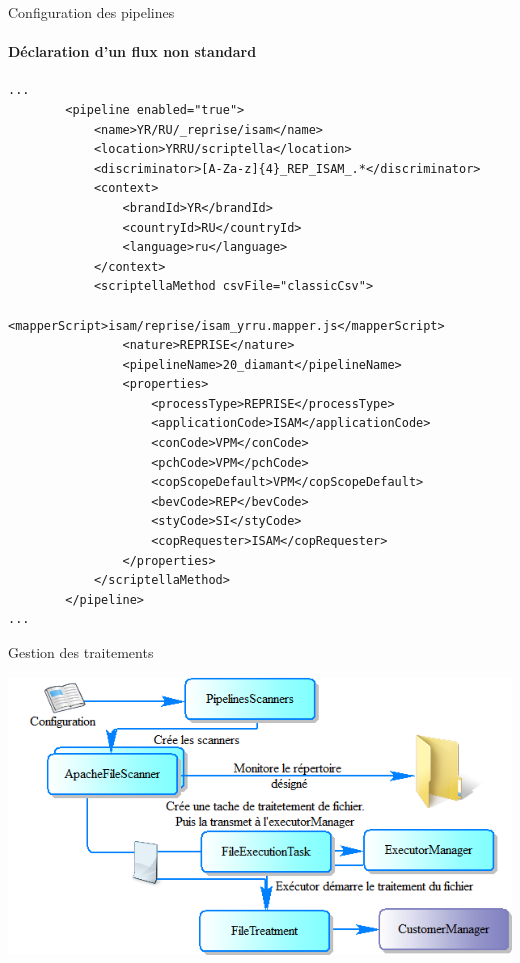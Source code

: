 \documentclass[compact]{beamer}%
\begin{document}
\begin{frame}[containsverbatim]{Configuration des pipelines}
	\framesubtitle{Déclaration d'un flux non standard}
	
	\lstset{language=XML}
	\begin{lstlisting}
...
		<pipeline enabled="true">
			<name>YR/RU/_reprise/isam</name>
			<location>YRRU/scriptella</location>
			<discriminator>[A-Za-z]{4}_REP_ISAM_.*</discriminator>
			<context>
				<brandId>YR</brandId>
				<countryId>RU</countryId>
				<language>ru</language>
			</context>
			<scriptellaMethod csvFile="classicCsv">
				<mapperScript>isam/reprise/isam_yrru.mapper.js</mapperScript>
				<nature>REPRISE</nature>
				<pipelineName>20_diamant</pipelineName>
				<properties>
					<processType>REPRISE</processType>
					<applicationCode>ISAM</applicationCode>
					<conCode>VPM</conCode>
					<pchCode>VPM</pchCode>
					<copScopeDefault>VPM</copScopeDefault>
					<bevCode>REP</bevCode>
					<styCode>SI</styCode>
					<copRequester>ISAM</copRequester>
				</properties>
			</scriptellaMethod>
		</pipeline>
...
	\end{lstlisting}

\end{frame}


\begin{frame}{Gestion des traitements}

	\includegraphics[width=\textwidth]{images/rc_pipelines.png}

\end{frame}

\lstset{language=JAVA}

\end{document}
